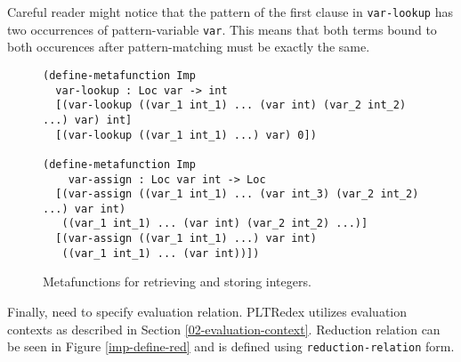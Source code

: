 Careful reader might notice that the pattern of the first clause in \texttt{var-lookup} has two occurrences of pattern-variable \texttt{var}. This means that both terms bound to both occurences after pattern-matching must be exactly the same.

\begin{figure}[h]
\begin{verbatim}
(define-metafunction Imp
  var-lookup : Loc var -> int
  [(var-lookup ((var_1 int_1) ... (var int) (var_2 int_2) ...) var) int]
  [(var-lookup ((var_1 int_1) ...) var) 0])

(define-metafunction Imp
    var-assign : Loc var int -> Loc 
  [(var-assign ((var_1 int_1) ... (var int_3) (var_2 int_2) ...) var int)
   ((var_1 int_1) ... (var int) (var_2 int_2) ...)]
  [(var-assign ((var_1 int_1) ...) var int)
   ((var_1 int_1) ... (var int))])
\end{verbatim}
\caption{Metafunctions for retrieving and storing integers.}
\label{imp-define-mf}
\end{figure}

Finally, need to specify evaluation relation. PLTRedex utilizes evaluation contexts as described in Section \ref{02-evaluation-context}. Reduction relation can be seen in Figure \ref{imp-define-red} and is defined using \texttt{reduction-relation} form.

